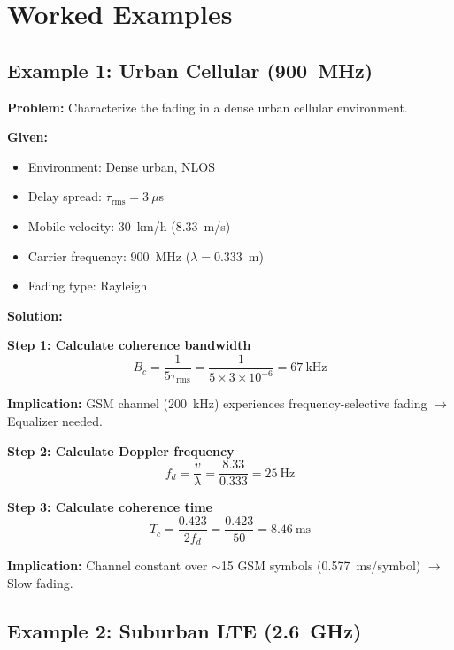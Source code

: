 \section{Worked Examples}

\subsection{Example 1: Urban Cellular (900~MHz)}

\textbf{Problem:} Characterize the fading in a dense urban cellular environment.

\textbf{Given:}
\begin{itemize}
\item Environment: Dense urban, NLOS
\item Delay spread: $\tau_{\text{rms}} = 3~\mu$s
\item Mobile velocity: 30~km/h (8.33~m/s)
\item Carrier frequency: 900~MHz ($\lambda = 0.333$~m)
\item Fading type: Rayleigh
\end{itemize}

\textbf{Solution:}

\textbf{Step 1: Calculate coherence bandwidth}
\begin{equation*}
B_c = \frac{1}{5\tau_{\text{rms}}} = \frac{1}{5 \times 3 \times 10^{-6}} = 67~\text{kHz}
\end{equation*}

\textbf{Implication:} GSM channel (200~kHz) experiences frequency-selective fading $\rightarrow$ Equalizer needed.

\textbf{Step 2: Calculate Doppler frequency}
\begin{equation*}
f_d = \frac{v}{\lambda} = \frac{8.33}{0.333} = 25~\text{Hz}
\end{equation*}

\textbf{Step 3: Calculate coherence time}
\begin{equation*}
T_c = \frac{0.423}{2f_d} = \frac{0.423}{50} = 8.46~\text{ms}
\end{equation*}

\textbf{Implication:} Channel constant over $\sim$15 GSM symbols (0.577~ms/symbol) $\rightarrow$ Slow fading.

\subsection{Example 2: Suburban LTE (2.6~GHz)}

